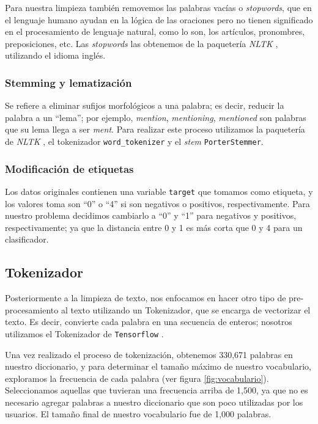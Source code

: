 \documentclass[sigconf, nonacm, spanish]{acmart}
\begin{document}
Para nuestra limpieza también removemos las palabras vacías o \textit{stopwords}, que en el lenguaje humano ayudan en la lógica de las oraciones pero no tienen significado en el procesamiento de lenguaje natural, como lo son, los artículos, pronombres, preposiciones, etc. Las \textit{stopwords} las obtenemos de la paquetería \textit{NLTK} \cite{nltk}, utilizando el idioma inglés.

\subsubsection{Stemming y lematización}

Se refiere a eliminar sufijos morfológicos a una palabra; es decir, reducir la palabra a un ``lema''; por ejemplo, \textit{mention}, \textit{mentioning}, \textit{mentioned} son palabras que su lema llega a ser \textit{ment}. Para realizar este proceso utilizamos la paquetería de \textit{NLTK} \cite{nltk}, el tokenizador \texttt{word\_tokenizer} y el \textit{stem} \texttt{PorterStemmer}. 

\subsubsection{Modificación de etiquetas}

Los datos originales contienen una variable \texttt{target} que tomamos como etiqueta, y los valores toma son ``0'' o ``4'' si son negativos o positivos, respectivamente. Para nuestro problema decidimos cambiarlo a ``0'' y ``1'' para negativos y positivos, respectivamente; ya que la distancia entre 0 y 1 es más corta que 0 y 4 para un clasificador.

\subsection{Tokenizador}

Posteriormente a la limpieza de texto, nos enfocamos en hacer otro tipo de pre-procesamiento al texto utilizando un Tokenizador, que se encarga de vectorizar el texto. Es decir, convierte cada palabra en una secuencia de enteros; nosotros utilizamos el Tokenizador de \texttt{Tensorflow} \cite{tersopreprocessing}. 

Una vez realizado el proceso de tokenización, obtenemos 330,671 palabras en nuestro diccionario, y para determinar el tamaño máximo de nuestro vocabulario, exploramos la frecuencia de cada palabra (ver figura \ref{fig:vocabulario}). Seleccionamos aquellas que tuvieran una frecuencia arriba de 1,500, ya que no es necesario agregar palabras a nuestro diccionario que son poco utilizadas por los usuarios. El tamaño final de nuestro vocabulario fue de 1,000 palabras.
\end{document}

